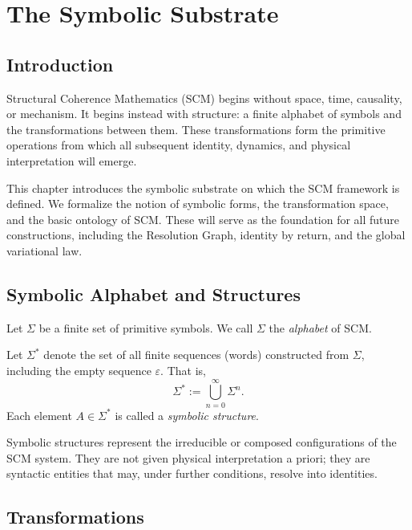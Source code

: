 \chapter{The Symbolic Substrate}

\section*{Introduction}

Structural Coherence Mathematics (SCM) begins without space, time, causality, or mechanism. It begins instead with structure: a finite alphabet of symbols and the transformations between them. These transformations form the primitive operations from which all subsequent identity, dynamics, and physical interpretation will emerge.

This chapter introduces the symbolic substrate on which the SCM framework is defined. We formalize the notion of symbolic forms, the transformation space, and the basic ontology of SCM. These will serve as the foundation for all future constructions, including the Resolution Graph, identity by return, and the global variational law.

\section{Symbolic Alphabet and Structures}

\begin{definition}[Alphabet]
Let $\Sigma$ be a finite set of primitive symbols. We call $\Sigma$ the \emph{alphabet} of SCM.
\end{definition}

\begin{definition}
Let $\Sigma^*$ denote the set of all finite sequences (words) constructed from $\Sigma$, including the empty sequence $\varepsilon$. That is,
\[
\Sigma^* := \bigcup_{n=0}^{\infty} \Sigma^n.
\]
Each element $A \in \Sigma^*$ is called a \emph{symbolic structure}.
\end{definition}

\noindent
Symbolic structures represent the irreducible or composed configurations of the SCM system. They are not given physical interpretation a priori; they are syntactic entities that may, under further conditions, resolve into identities.

\section{Transformations}

